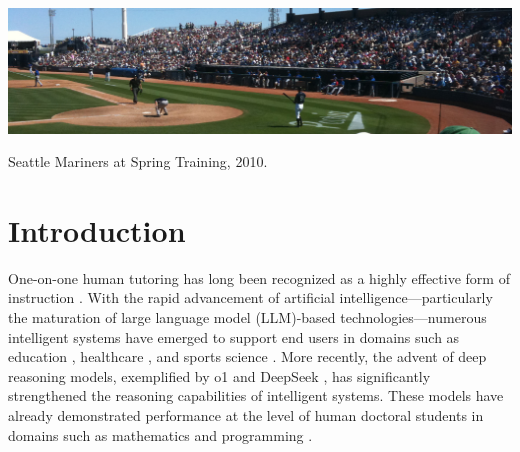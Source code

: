 \documentclass[sigconf]{acmart}
\begin{document}



\begin{teaserfigure}
  \includegraphics[width=\textwidth]{sampleteaser}
  \caption{Seattle Mariners at Spring Training, 2010.}
  \label{fig:teaser}
\end{teaserfigure}

\maketitle

\section{Introduction}

One-on-one human tutoring has long been recognized as a highly effective form of instruction \cite{chiLearningHumanTutoring2001}. With the rapid advancement of artificial intelligence—particularly the maturation of large language model (LLM)-based technologies—numerous intelligent systems have emerged to support end users in domains such as education \cite{wangLargeLanguageModels2024}, healthcare \cite{heSurveyLargeLanguage2025}, and sports science \cite{connorLargeLanguageModels2023}. More recently, the advent of deep reasoning models, exemplified by o1 \cite{openaiOpenAIO1System2024a} and DeepSeek \cite{deepseek-aiDeepSeekR1IncentivizingReasoning2025b}, has significantly strengthened the reasoning capabilities of intelligent systems. These models have already demonstrated performance at the level of human doctoral students in domains such as mathematics \cite{chenDeepMathCreativeBenchmarkEvaluating2025} and programming \cite{jainLiveCodeBenchHolisticContamination2024}.
\end{document}
